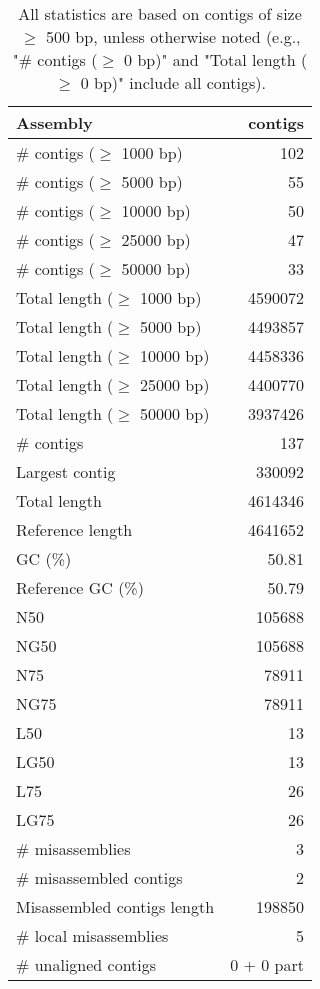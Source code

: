 \documentclass[12pt,a4paper]{article}
\begin{document}
\begin{table}[ht]
\begin{center}
\caption{All statistics are based on contigs of size $\geq$ 500 bp, unless otherwise noted (e.g., "\# contigs ($\geq$ 0 bp)" and "Total length ($\geq$ 0 bp)" include all contigs).}
\begin{tabular}{|l*{1}{|r}|}
\hline
Assembly & contigs \\ \hline
\# contigs ($\geq$ 1000 bp) & 102 \\ \hline
\# contigs ($\geq$ 5000 bp) & 55 \\ \hline
\# contigs ($\geq$ 10000 bp) & 50 \\ \hline
\# contigs ($\geq$ 25000 bp) & 47 \\ \hline
\# contigs ($\geq$ 50000 bp) & 33 \\ \hline
Total length ($\geq$ 1000 bp) & 4590072 \\ \hline
Total length ($\geq$ 5000 bp) & 4493857 \\ \hline
Total length ($\geq$ 10000 bp) & 4458336 \\ \hline
Total length ($\geq$ 25000 bp) & 4400770 \\ \hline
Total length ($\geq$ 50000 bp) & 3937426 \\ \hline
\# contigs & 137 \\ \hline
Largest contig & 330092 \\ \hline
Total length & 4614346 \\ \hline
Reference length & 4641652 \\ \hline
GC (\%) & 50.81 \\ \hline
Reference GC (\%) & 50.79 \\ \hline
N50 & 105688 \\ \hline
NG50 & 105688 \\ \hline
N75 & 78911 \\ \hline
NG75 & 78911 \\ \hline
L50 & 13 \\ \hline
LG50 & 13 \\ \hline
L75 & 26 \\ \hline
LG75 & 26 \\ \hline
\# misassemblies & 3 \\ \hline
\# misassembled contigs & 2 \\ \hline
Misassembled contigs length & 198850 \\ \hline
\# local misassemblies & 5 \\ \hline
\# unaligned contigs & 0 + 0 part \\ \hline

\end{tabular}
\end{center}
\end{table}
\end{document}
